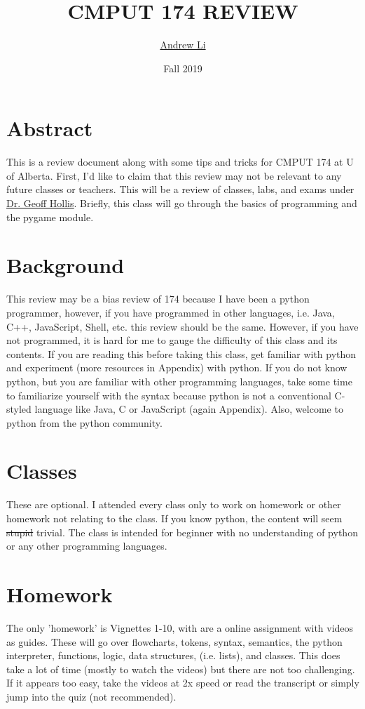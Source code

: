 \documentclass[12pt]{article}
\title{CMPUT 174 REVIEW}
\author{\href{https://github.com/Zeyu-Li}{Andrew Li}}
\date{Fall 2019}
\begin{document}
\maketitle

\section{Abstract}
This is a review document along with some tips and tricks for CMPUT 174 at U of Alberta. First, I'd like to claim that this review may not be relevant to any future classes or teachers. This will be a review of classes, labs, and exams under  \underline{\href{run:https://sites.ualberta.ca/~hollis/}{Dr. Geoff Hollis}}. Briefly, this class will go through the basics of programming and the pygame module. 

\section{Background}
This review may be a bias review of 174 because I have been a python programmer, however, if you have programmed in other languages, i.e. Java, C++, JavaScript, Shell, etc. this review should be the same. However, if you have not programmed, it is hard for me to gauge the difficulty of this class and its contents. If you are reading this before taking this class, get familiar with python and experiment (more resources in Appendix) with python. If you do not know python, but you are familiar with other programming languages, take some time to familiarize yourself with the syntax because python is not a conventional C-styled language like Java, C or JavaScript (again Appendix). Also, welcome to python from the python community. 

\section{Classes}
These are optional. I attended every class only to work on homework or other homework not relating to the class. If you know python, the content will seem \sout{stupid} trivial. The class is intended for beginner with no understanding of python or any other programming languages. 

\section{Homework}
The only 'homework' is Vignettes 1-10, with are a online assignment with videos as guides. These will go over flowcharts, tokens, syntax, semantics, the python interpreter, functions, logic, data structures, (i.e. lists), and classes. This does take a lot of time (mostly to watch the videos) but there are not too challenging. If it appears too easy, take the videos at 2x speed or read the transcript or simply jump into the quiz (not recommended). 
\end{document}
